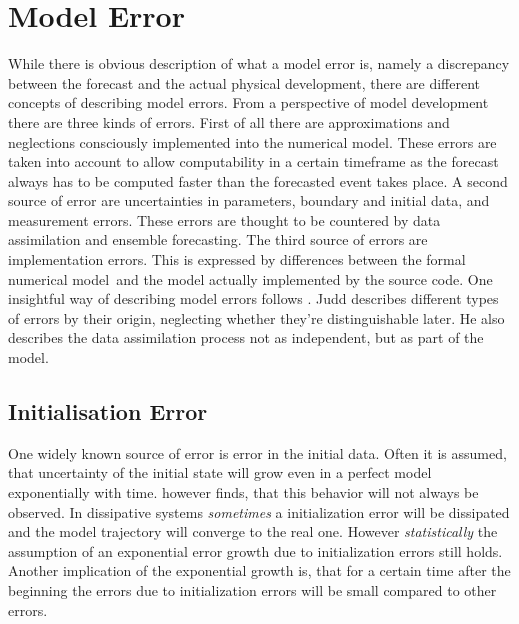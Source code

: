 \section{Model Error}
While there is obvious description of what a model error is, namely a discrepancy between the forecast and the actual physical development, there are different concepts of describing model errors.
\p
From a perspective of model development there are three kinds of errors. First of all there are approximations and neglections consciously implemented into the numerical model. These errors are taken into account to allow computability in a certain timeframe as the forecast always has to be computed faster than the forecasted event takes place. A second source of error are uncertainties in parameters, boundary and initial data, and measurement errors. These errors are thought to be countered by data assimilation and ensemble forecasting. The third source of errors are implementation errors. This is expressed by differences between the formal \glqq numerical model\grqq\ and the model actually implemented by the source code.
\p                                
One insightful way of describing model errors follows \cite{judd2008geometry}. Judd describes different types of errors by their origin, neglecting whether they're distinguishable later. He also describes the data assimilation process not as independent, but as part of the model.
\subsection{Initialisation Error}
\p
One widely known source of error is error in the initial data. Often it is assumed, that uncertainty of the initial state will grow even in a perfect model exponentially with time. \cite{smith1999uncertainty} however finds, that this behavior will not always be observed. 
\p In dissipative systems \emph{sometimes} a initialization error will be dissipated and the model trajectory will converge to the real one. However \emph{statistically} the assumption of an exponential error growth due to initialization errors still holds.
\p
Another implication of the exponential growth is, that for a certain time after the beginning the errors due to initialization errors will be small compared to other errors.
